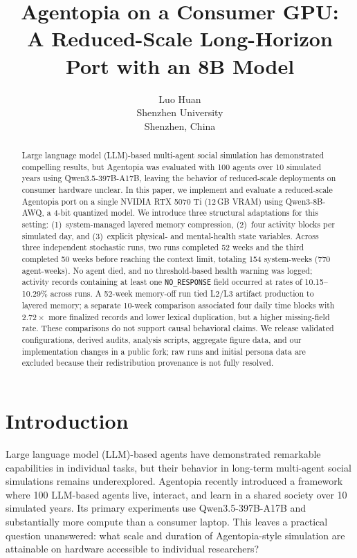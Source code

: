 \documentclass[11pt]{article}
\title{Agentopia on a Consumer GPU:\\ A Reduced-Scale Long-Horizon Port with an 8B Model}
\author{Luo Huan \\
  Shenzhen University \\
  Shenzhen, China \\
}
\begin{document}
\maketitle

\begin{abstract}
Large language model (LLM)-based multi-agent social simulation has demonstrated compelling results, but Agentopia was evaluated with 100 agents over 10 simulated years using Qwen3.5-397B-A17B, leaving the behavior of reduced-scale deployments on consumer hardware unclear.
In this paper, we implement and evaluate a reduced-scale Agentopia port on a single NVIDIA RTX 5070 Ti (12\,GB VRAM) using Qwen3-8B-AWQ, a 4-bit quantized model.
We introduce three structural adaptations for this setting: (1)~system-managed layered memory compression, (2)~four activity blocks per simulated day, and (3)~explicit physical- and mental-health state variables.
Across three independent stochastic runs, two runs completed 52 weeks and the third completed 50 weeks before reaching the context limit, totaling 154 system-weeks (770 agent-weeks).
No agent died, and no threshold-based health warning was logged; activity records containing at least one \texttt{NO\_RESPONSE} field occurred at rates of 10.15--10.29\% across runs.
A 52-week memory-off run tied L2/L3 artifact production to layered memory; a separate 10-week comparison associated four daily time blocks with $2.72\times$ more finalized records and lower lexical duplication, but a higher missing-field rate.
These comparisons do not support causal behavioral claims.
We release validated configurations, derived audits, analysis scripts, aggregate figure data, and our implementation changes in a public fork; raw runs and initial persona data are excluded because their redistribution provenance is not fully resolved.
\end{abstract}

\section{Introduction}

Large language model (LLM)-based agents have demonstrated remarkable capabilities in individual tasks, but their behavior in long-term multi-agent social simulations remains underexplored.
Agentopia \citep{wang2026agentopia} recently introduced a framework where 100 LLM-based agents live, interact, and learn in a shared society over 10 simulated years.
Its primary experiments use Qwen3.5-397B-A17B and substantially more compute than a consumer laptop.
This leaves a practical question unanswered: what scale and duration of Agentopia-style simulation are attainable on hardware accessible to individual researchers?
\end{document}

